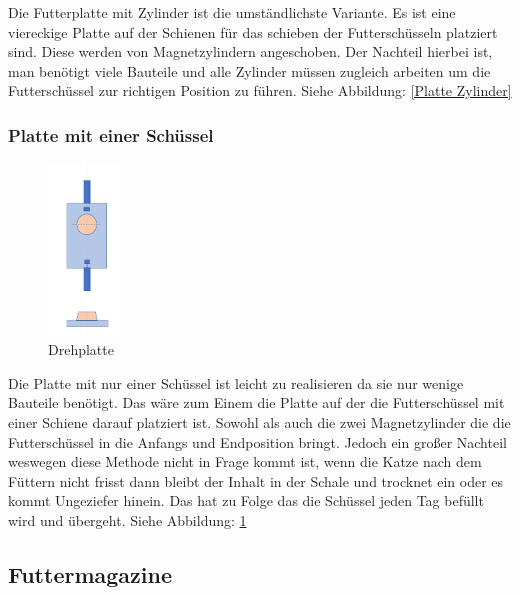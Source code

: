 Die Futterplatte mit Zylinder ist die umständlichste Variante. Es ist eine viereckige Platte auf der Schienen für das schieben der Futterschüsseln platziert sind. Diese werden von Magnetzylindern angeschoben. Der Nachteil hierbei ist, man benötigt viele Bauteile und alle Zylinder müssen zugleich arbeiten um die Futterschüssel zur richtigen Position zu führen. Siehe Abbildung: \ref{Platte Zylinder}



\newpage
\subsubsection{Platte mit einer Schüssel}

\begin{figure}
\vspace{-40pt}
  \begin{center}
    \includegraphics[width=0.17\textwidth]{Bilder/Powerpoint/Einschuessel_platte}
  \end{center}
  \caption{Drehplatte}
  \label{Schüssel Eins}
  \vspace{-20pt}
\end{figure}

Die Platte mit nur einer Schüssel ist leicht zu realisieren da sie nur wenige Bauteile benötigt. Das wäre zum Einem die Platte auf der die Futterschüssel mit einer Schiene darauf platziert ist. Sowohl als auch die zwei Magnetzylinder die die Futterschüssel in die Anfangs und Endposition bringt. Jedoch ein großer Nachteil weswegen diese Methode nicht in Frage kommt ist, wenn die Katze nach dem Füttern nicht frisst dann bleibt der Inhalt in der Schale und trocknet ein oder es kommt Ungeziefer hinein. Das hat zu Folge das die Schüssel jeden Tag befüllt wird und übergeht. Siehe Abbildung: \ref{Schüssel Eins}


\subsection{Futtermagazine}

